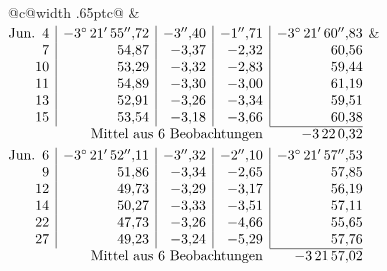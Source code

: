 \noindent\begin{tabular}{@{}c@{\hspace{.4em}\vrule width .65pt\hspace{.4em}}c@{}}
 &
 \\[.18ex]
\(\begin{array}[t]{@{}r|r|r|r|r@{}}
\text{Jun.}\enspace 4 & -3^\circ\,21'\,55''{,}72 & -3''{,}40 & -1''{,}71 & -3^\circ\,21'\,60''{,}83\\
7 & 54{,}87 & -3{,}37 & -2{,}32 & 60{,}56\\
10 & 53{,}29 & -3{,}32 & -2{,}83 & 59{,}44\\
11 & 54{,}89 & -3{,}30 & -3{,}00 & 61{,}19\\
13 & 52{,}91 & -3{,}26 & -3{,}34 & 59{,}51\\
15 & 53{,}54 & -3{,}18 & -3{,}66 & 60{,}38\\
\cline{5-5}
\multicolumn{4}{r}{\text{Mittel aus 6 Beobachtungen}} & -3\,22\,0{,}32
\end{array}\)
&
\(\begin{array}[t]{@{}r|r|r|r|r@{}}
\text{Jun.}\enspace 6 & -3^\circ\,21'\,52''{,}11 & -3''{,}32 & -2''{,}10 & -3^\circ\,21'\,57''{,}53\\
9 & 51{,}86 & -3{,}34 & -2{,}65 & 57{,}85\\
12 & 49{,}73 & -3{,}29 & -3{,}17 & 56{,}19\\
14 & 50{,}27 & -3{,}33 & -3{,}51 & 57{,}11\\
22 & 47{,}73 & -3{,}26 & -4{,}66 & 55{,}65\\
27 & 49{,}23 & -3{,}24 & -5{,}29 & 57{,}76\\
\cline{5-5}
\multicolumn{4}{r}{\text{Mittel aus 6 Beobachtungen}} & -3\,21\,57{,}02
\end{array}\)
\end{tabular}\par\medskip
{}
